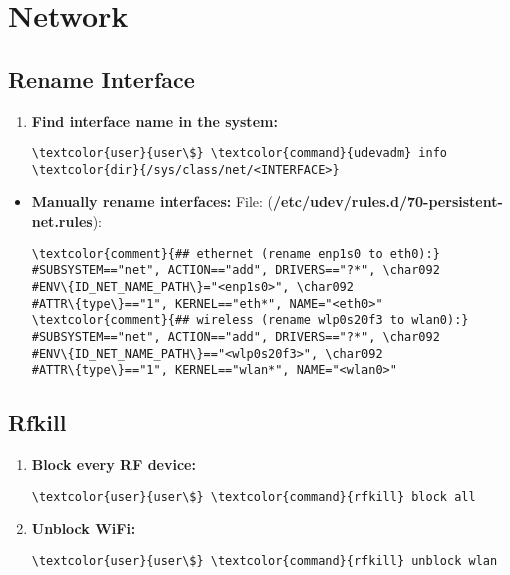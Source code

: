 \documentclass[10pt, a4paper, onecolumn, openany]{book} %
\begin{document}
\chapter{Network}
\section{Rename Interface}
\begin{enumerate}
    \item \textbf{Find interface name in the system:}
\begin{Verbatim}[commandchars=\\\{\}]
\textcolor{user}{user\$} \textcolor{command}{udevadm} info \textcolor{dir}{/sys/class/net/<INTERFACE>}
\end{Verbatim}    
\end{enumerate}

\begin{itemize}
    \item \textbf{Manually rename interfaces:}
\newline File: (\textcolor{file}{\textbf{/etc/udev/rules.d/70-persistent-net.rules}}):
\begin{Verbatim}[commandchars=\\\{\}]
\textcolor{comment}{## ethernet (rename enp1s0 to eth0):}
#SUBSYSTEM=="net", ACTION=="add", DRIVERS=="?*", \char092
#ENV\{ID_NET_NAME_PATH\}="<enp1s0>", \char092
#ATTR\{type\}=="1", KERNEL=="eth*", NAME="<eth0>"
\textcolor{comment}{## wireless (rename wlp0s20f3 to wlan0):}
#SUBSYSTEM=="net", ACTION=="add", DRIVERS=="?*", \char092
#ENV\{ID_NET_NAME_PATH\}=="<wlp0s20f3>", \char092
#ATTR\{type\}=="1", KERNEL=="wlan*", NAME="<wlan0>"
\end{Verbatim}
\end{itemize}
\section{Rfkill}
\begin{enumerate}
    \item \textbf{Block every RF device:}
\begin{Verbatim}[commandchars=\\\{\}]
\textcolor{user}{user\$} \textcolor{command}{rfkill} block all
\end{Verbatim}  
    \item \textbf{Unblock WiFi:}
\begin{Verbatim}[commandchars=\\\{\}]
\textcolor{user}{user\$} \textcolor{command}{rfkill} unblock wlan
\end{Verbatim}  
\end{enumerate}
\end{document}
